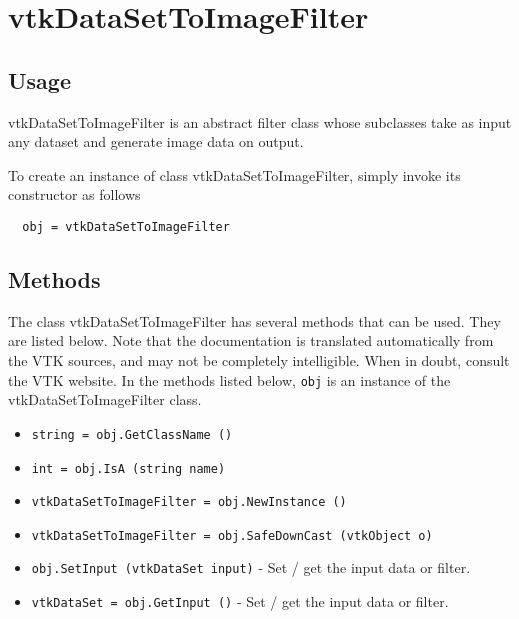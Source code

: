 \section{vtkDataSetToImageFilter}

\subsection{Usage}

 vtkDataSetToImageFilter is an abstract filter class whose subclasses take
 as input any dataset and generate image data on output.

To create an instance of class vtkDataSetToImageFilter, simply
invoke its constructor as follows
\begin{verbatim}
  obj = vtkDataSetToImageFilter
\end{verbatim}
\subsection{Methods}

The class vtkDataSetToImageFilter has several methods that can be used.
  They are listed below.
Note that the documentation is translated automatically from the VTK sources,
and may not be completely intelligible.  When in doubt, consult the VTK website.
In the methods listed below, \verb|obj| is an instance of the vtkDataSetToImageFilter class.
\begin{itemize}
\item  \verb|string = obj.GetClassName ()|

\item  \verb|int = obj.IsA (string name)|

\item  \verb|vtkDataSetToImageFilter = obj.NewInstance ()|

\item  \verb|vtkDataSetToImageFilter = obj.SafeDownCast (vtkObject o)|

\item  \verb|obj.SetInput (vtkDataSet input)| -  Set / get the input data or filter.

\item  \verb|vtkDataSet = obj.GetInput ()| -  Set / get the input data or filter.

\end{itemize}
